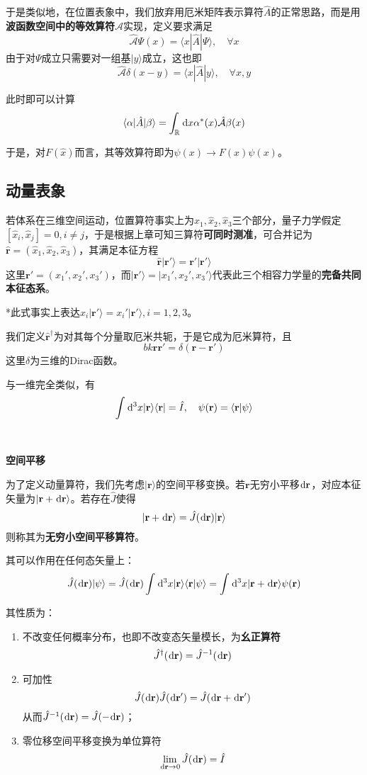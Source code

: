 \documentclass[a4paper,UTF8,fontset=windows]{ctexart}
\newcommand*{\dr}{\hspace{0.07em}\mathrm{d}}
\newcommand*{\ket}[1]{|#1\rangle}
\newcommand*{\bra}[1]{\langle#1|}
\newcommand*{\bk}[2]{\langle#1|#2\rangle}
\newcommand*{\blk}[3]{\langle#1|#2|#3\rangle}
\newcommand*{\br}{\mathbf{r}}
\begin{document}
于是类似地，在位置表象中，我们放弃用厄米矩阵表示算符$\hat{A}$的正常思路，而是用\textbf{波函数空间中的等效算符}$\hat{\mathcal{A}}$实现，定义要求满足
$$\hat{\mathcal{A}}\Psi(x)=\blk{x}{\hat{A}}{\Psi},\quad\forall x$$
由于对$\Psi$成立只需要对一组基$\ket{y}$成立，这也即
$$\hat{\mathcal{A}}\delta(x-y)=\blk{x}{\hat{A}}{y},\quad\forall x,y$$

此时即可以计算
$$\blk{\alpha}{\hat{A}}{\beta}=\int_\mathbb{R}\dr x\alpha^*(x)\hat{\mathcal{A}}\beta(x)$$

于是，对$F(\hat{x})$而言，其等效算符即为$\psi(x)\to F(x)\psi(x)$。

\subsection{动量表象}
若体系在三维空间运动，位置算符事实上为$\hat{x}_1,\hat{x}_2,\hat{x}_3$三个部分，量子力学假定$[\hat{x}_i,\hat{x}_j]=0,i\ne j$，于是根据上章可知三算符\textbf{可同时测准}，可合并记为$\hat{\br}=(\hat{x}_1,\hat{x}_2,\hat{x}_3)$，其满足本征方程
$$\hat{\br}\ket{\br'}=\br'\ket{\br'}$$
这里$\br'=(x_1',x_2',x_3')$，而$\ket{\br'}=\ket{x_1',x_2',x_3'}$代表此三个相容力学量的\textbf{完备共同本征态系}。

*此式事实上表达$\hat{x}_i\ket{\br'}=x_i'\ket{\br'},i=1,2,3$。

我们定义$\hat{\br}^\dagger$为对其每个分量取厄米共轭，于是它成为厄米算符，且
$$bk{\br}{\br'}=\delta(\br-\br')$$
这里$\delta$为三维的Dirac函数。

与一维完全类似，有
$$\int\dr^3x\ket{\br}\bra{\br}=\hat{I},\quad\psi(\br)=\bk{\br}{\psi}$$

\

\textbf{空间平移}

为了定义动量算符，我们先考虑$\ket{\br}$的空间平移变换。若$\br$无穷小平移$\dr\br$，对应本征矢量为$\ket{\br+\dr\br}$。若存在$\hat{J}$使得
$$\ket{\br+\dr\br}=\hat{J}(\dr\br)\ket{\br}$$
则称其为\textbf{无穷小空间平移算符}。

其可以作用在任何态矢量上：
$$\hat{J}(\dr\br)\ket{\psi}=\hat{J}(\dr\br)\int\dr^3x\ket{\br}\bk{\br}{\psi}=\int\dr^3x\ket{\br+\dr\br}\psi(\br)$$

其性质为：
\begin{enumerate}
    \item 不改变任何概率分布，也即不改变态矢量模长，为\textbf{幺正算符}
    $$\hat{J}^\dagger(\dr\br)=\hat{J}^{-1}(\dr\br)$$
    \item 可加性
    $$\hat{J}(\dr\br)\hat{J}(\dr\br')=\hat{J}(\dr\br+\dr\br')$$
    从而$\hat{J}^{-1}(\dr\br)=\hat{J}(-\dr\br)$；
    \item 零位移空间平移变换为单位算符
    $$\lim_{\dr\br\to0}\hat{J}(\dr\br)=\hat{I}$$
\end{enumerate}
\end{document}
